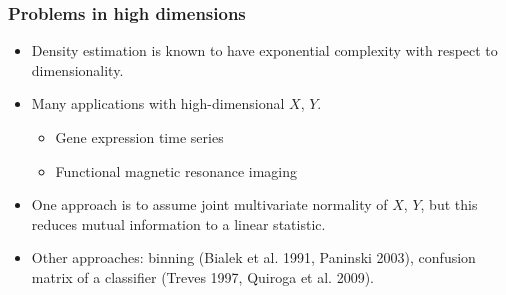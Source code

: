 \documentclass{beamer}
\begin{document}
\begin{frame}
\frametitle{Problems in high dimensions}
\begin{itemize}
\item Density estimation is known to have exponential complexity with respect to dimensionality.
\item Many applications with high-dimensional $X$, $Y$.
\begin{itemize}
\item Gene expression time series
\item Functional magnetic resonance imaging
\end{itemize}
\item One approach is to assume joint multivariate normality of $X$, $Y$, but this reduces mutual information to a linear statistic.
\item Other approaches: binning (Bialek et al. 1991, Paninski 2003), confusion matrix of a classifier (Treves 1997, Quiroga et al. 2009).
\end{itemize}
\end{frame}
\end{document}

